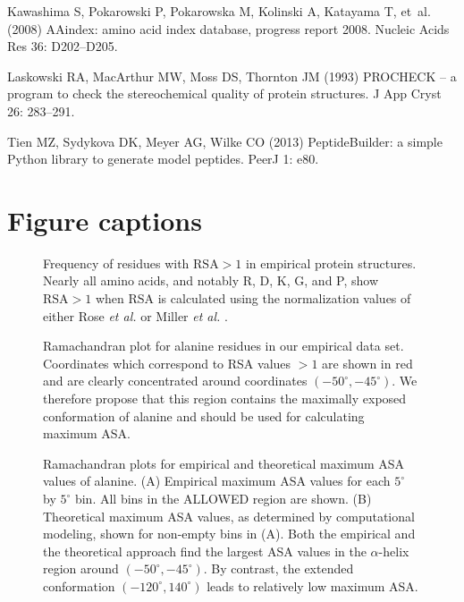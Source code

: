 \documentclass[11pt]{article}
\begin{document}
\begin{thebibliography}{10}
Kawashima S, Pokarowski P, Pokarowska M, Kolinski A, Katayama T, et~al. (2008)
  {AAindex:} amino acid index database, progress report 2008.
\newblock Nucleic Acids Res 36: D202--D205.

Laskowski RA, MacArthur MW, Moss DS, Thornton JM (1993) {PROCHECK} -- a program
  to check the stereochemical quality of protein structures.
\newblock J App Cryst 26: 283--291.

Tien MZ, Sydykova DK, Meyer AG, Wilke CO (2013) {PeptideBuilder:} a simple
  {Python} library to generate model peptides.
\newblock PeerJ 1: e80.

\end{thebibliography}
\newpage

\section*{Figure captions}

\begin{figure}[H]
\caption{\label{fig:BarGraphRSA}Frequency of residues with $\text{RSA}>1$ in empirical protein structures. Nearly all amino acids, and notably R, D, K, G, and P, show $\text{RSA}>1$ 
when RSA is calculated using the normalization values of either Rose \emph{et al.} \cite{Rose1985} or Miller \emph{et al.} \cite{Miller1987}.}
\end{figure}

\begin{figure}[H]
\caption{\label{fig:RamaAla}Ramachandran plot for alanine residues in our empirical data set. Coordinates which correspond to RSA values $>1$ are shown in red and are clearly concentrated around coordinates $(-50^\circ,-45^\circ)$. We therefore propose that this region contains the maximally exposed conformation of alanine and should be used for calculating maximum ASA.}
\end{figure}

\begin{figure}[H]
\caption{\label{fig:heatrama} Ramachandran plots for empirical and theoretical maximum ASA values of alanine. (A) Empirical maximum ASA values for each $5^\circ$ by $5^\circ$ bin. All bins in the ALLOWED region are shown. (B) Theoretical maximum ASA values, as determined by computational modeling, shown for non-empty bins in (A). Both the empirical and the theoretical approach find the largest ASA values in the $\alpha$-helix region around $(-50^\circ,-45^\circ)$. By contrast, the extended conformation $(-120^\circ, 140^\circ)$ leads to relatively low maximum ASA.}
\end{figure}
\end{document}
